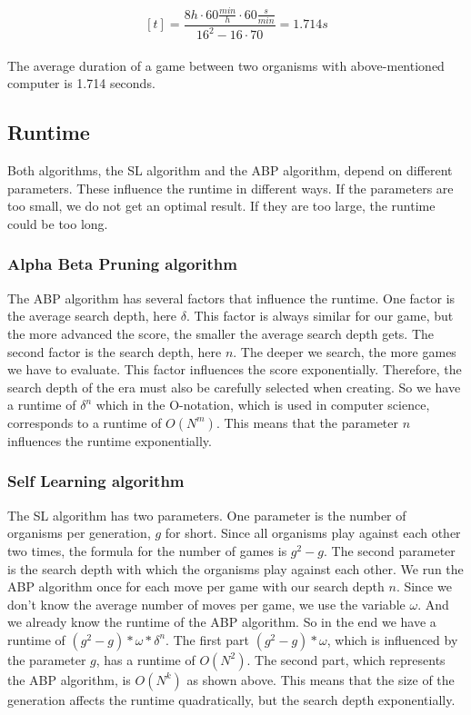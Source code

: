 $$ [t] =  \frac{8h \cdot 60\frac{min}{h} \cdot 60\frac{s}{min}}{16^2 - 16 \cdot 70} = 1.714s$$\\
The average duration of a game between two organisms with above-mentioned computer is 1.714 seconds.

\subsection{Runtime}
Both algorithms, the \ac{SL} algorithm and the \ac{ABP} algorithm, depend on different parameters. These influence the runtime in different ways. If the parameters are too small, we do not get an optimal result. If they are too large, the runtime could be too long.

\subsubsection{Alpha Beta Pruning algorithm}
The \ac{ABP} algorithm has several factors that influence the runtime. One factor is the average search depth, here $\delta$. This factor is always similar for our game, but the more advanced the score, the smaller the average  search depth gets. The second factor is the search depth, here $n$. The deeper we search, the more games we have to evaluate. This factor influences the score exponentially.  Therefore, the search depth of the era must also be carefully selected when creating. So we have a runtime of $\delta^n$ which in the O-notation, which is used in computer science, corresponds to a runtime of $O(N^{m})$. This means that the parameter $n$ influences the runtime exponentially.

\subsubsection{Self Learning algorithm}
The \ac{SL} algorithm has two parameters. One parameter is the number of organisms per generation, $g$ for short. Since all organisms play against each other two times, the formula for the number of games is $g^2 - g$.  The second parameter is the search depth with which the organisms play against each other. We run the \ac{ABP} algorithm once for each move per game with our search depth $n$. Since we don't know the average number of moves per game, we use the variable $\omega$.  And we already know the runtime of the \ac{ABP} algorithm. So in the end we have a runtime of $(g^2 - g) * \omega * \delta^n$. The first part $(g^2 - g) * \omega$, which is influenced by the parameter $g$, has a runtime of $O(N^2)$. The second part, which represents the \ac{ABP} algorithm, is $O(N^k)$ as shown above. This means that the size of the generation affects the runtime quadratically, but the search depth exponentially.



